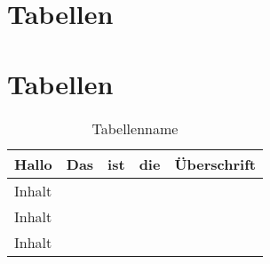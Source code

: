 \section{Tabellen}

\section{Tabellen}
\begin{table}[h]
\begin{tabular}{l|l|l|l|l}
Hallo  & Das & ist & die & Überschrift \\ \hline
Inhalt &     &     &     &             \\
Inhalt &     &     &     &             \\
Inhalt &     &     &     &            
\end{tabular}
\caption{Tabellenname}
\end{table}